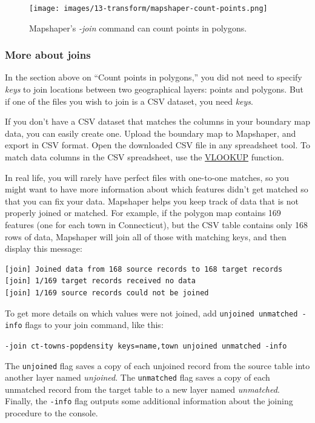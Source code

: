 \documentclass[
  english,
]{book}
\begin{document}
\begin{figure}
\centering
\texttt{[image: images/13-transform/mapshaper-count-points.png]}
\caption{\label{fig:mapshaper-count-points}Mapshaper's \emph{-join} command can count points in polygons.}
\end{figure}

\hypertarget{more-about-joins}{%
\subsubsection*{More about joins}\label{more-about-joins}}

In the section above on ``Count points in polygons,'' you did not need to specify \emph{keys} to join locations between two geographical layers: points and polygons. But if one of the files you wish to join is a CSV dataset, you need \emph{keys}.

If you don't have a CSV dataset that matches the columns in your boundary map data, you can easily create one.
Upload the boundary map to Mapshaper, and export in CSV format. Open the downloaded CSV file in any spreadsheet tool.
To match data columns in the CSV spreadsheet, use the \href{vlookup.html}{VLOOKUP} function.

In real life, you will rarely have perfect files with one-to-one matches,
so you might want to have more information about which features didn't get matched so
that you can fix your data.
Mapshaper helps you keep track of data that is not properly joined or matched. For example, if the polygon map contains 169 features
(one for each town in Connecticut), but the CSV table contains only 168 rows of data, Mapshaper will join all of those with matching keys,
and then display this message:

\begin{verbatim}
[join] Joined data from 168 source records to 168 target records
[join] 1/169 target records received no data
[join] 1/169 source records could not be joined
\end{verbatim}

To get more details on which values were not joined, add \texttt{unjoined\ unmatched\ -info} flags to your join command, like this:

\texttt{-join\ ct-towns-popdensity\ keys=name,town\ unjoined\ unmatched\ -info}

The \texttt{unjoined} flag saves a copy of each unjoined record from the source table into another layer named \emph{unjoined}. The \texttt{unmatched} flag saves a copy of each unmatched record from the target table to a new layer named \emph{unmatched}. Finally, the \texttt{-info} flag outputs some additional information about the joining procedure to the console.
\end{document}
